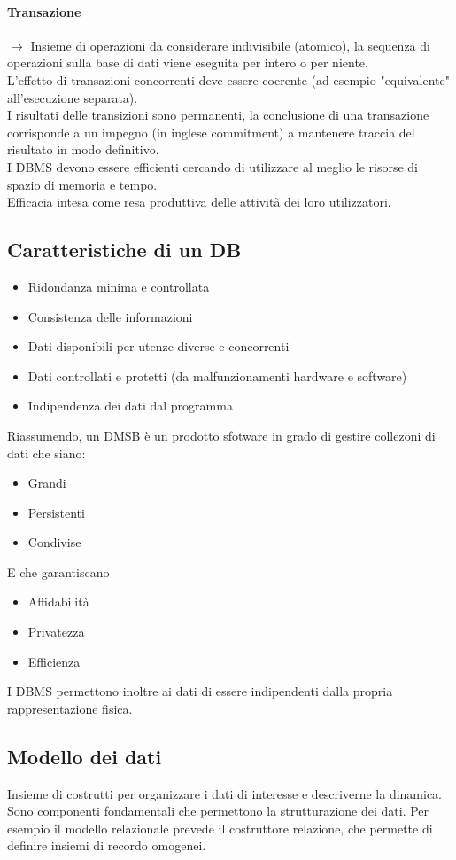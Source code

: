 \paragraph{Transazione} $\to$ Insieme di operazioni da considerare indivisibile (atomico),
la sequenza di operazioni sulla base di dati viene eseguita per intero o per niente.
\\L'effetto di transazioni concorrenti deve essere coerente (ad esempio "equivalente"
all'esecuzione separata).
\\I risultati delle transizioni sono permanenti, la conclusione di una transazione
corrisponde a un impegno (in inglese commitment) a mantenere traccia del risultato in modo
definitivo.
\\ I DBMS devono essere efficienti cercando di utilizzare al meglio le risorse di
spazio di memoria e tempo.
\\ Efficacia intesa come resa produttiva delle attività dei loro utilizzatori.
\subsection*{Caratteristiche di un DB}
\begin{itemize}
    \item Ridondanza minima e controllata
    \item Consistenza delle informazioni
    \item Dati disponibili per utenze diverse e concorrenti
    \item Dati controllati e protetti (da malfunzionamenti hardware e software)
    \item Indipendenza dei dati dal programma
\end{itemize}
Riassumendo, un DMSB è un prodotto sfotware in grado di gestire collezoni di dati che
siano:
\begin{itemize}
    \item Grandi
    \item Persistenti
    \item Condivise
\end{itemize}
E che garantiscano
\begin{itemize}
    \item Affidabilità
    \item Privatezza
    \item Efficienza
\end{itemize}
I DBMS permettono inoltre ai dati di essere indipendenti dalla propria rappresentazione
fisica.
\subsection{Modello dei dati}
Insieme di costrutti per organizzare i dati di interesse e descriverne la dinamica.
Sono componenti fondamentali che permettono la strutturazione dei dati.
Per esempio il modello relazionale prevede il costruttore relazione, che permette
di definire insiemi di recordo omogenei.
